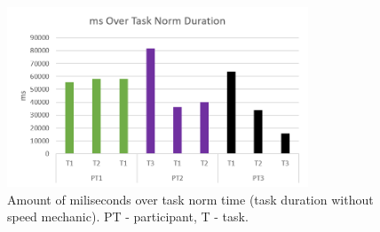 \begin{figure}[htb]
	\centering
	\includegraphics[width=0.8\textwidth]{figures/msOverTaskNorm.png}
	\caption[TCT of all sessions.]{Amount of miliseconds over task norm time (task duration without speed mechanic). PT - participant, T - task.}
	\label{fig:tct}
\end{figure}

